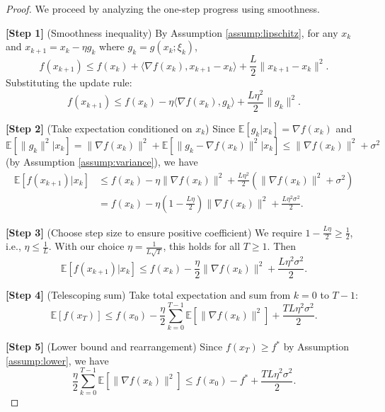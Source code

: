 \documentclass{article}
\begin{document}
\begin{proof}
    We proceed by analyzing the one-step progress using smoothness.

    \noindent \textbf{[Step 1]} (Smoothness inequality) By Assumption \ref{assump:lipschitz}, for any $x_k$ and $x_{k+1} = x_k - \eta g_k$ where $g_k = g(x_k; \xi_k)$,
    \begin{equation}
        f(x_{k+1}) \le f(x_k) + \langle \nabla f(x_k), x_{k+1}-x_k \rangle + \frac{L}{2}\|x_{k+1}-x_k\|^2.
    \end{equation}
    Substituting the update rule:
    \begin{equation}
        f(x_{k+1}) \le f(x_k) - \eta \langle \nabla f(x_k), g_k \rangle + \frac{L\eta^2}{2}\|g_k\|^2. \tag{1}
    \end{equation}

    \noindent \textbf{[Step 2]} (Take expectation conditioned on $x_k$) Since $\mathbb{E}[g_k | x_k] = \nabla f(x_k)$ and $\mathbb{E}[\|g_k\|^2 | x_k] = \|\nabla f(x_k)\|^2 + \mathbb{E}[\|g_k - \nabla f(x_k)\|^2 | x_k] \le \|\nabla f(x_k)\|^2 + \sigma^2$ (by Assumption \ref{assump:variance}), we have
    \begin{align}
        \mathbb{E}[f(x_{k+1}) | x_k] &\le f(x_k) - \eta \|\nabla f(x_k)\|^2 + \frac{L\eta^2}{2}\left(\|\nabla f(x_k)\|^2 + \sigma^2\right) \\
        &= f(x_k) - \eta\left(1 - \frac{L\eta}{2}\right)\|\nabla f(x_k)\|^2 + \frac{L\eta^2\sigma^2}{2}. \tag{2}
    \end{align}

    \noindent \textbf{[Step 3]} (Choose step size to ensure positive coefficient) We require $1 - \frac{L\eta}{2} \ge \frac{1}{2}$, i.e., $\eta \le \frac{1}{L}$. With our choice $\eta = \frac{1}{L\sqrt{T}}$, this holds for all $T \ge 1$. Then
    \begin{equation}
        \mathbb{E}[f(x_{k+1}) | x_k] \le f(x_k) - \frac{\eta}{2}\|\nabla f(x_k)\|^2 + \frac{L\eta^2\sigma^2}{2}. \tag{3}
    \end{equation}

    \noindent \textbf{[Step 4]} (Telescoping sum) Take total expectation and sum from $k=0$ to $T-1$:
    \begin{equation}
        \mathbb{E}[f(x_T)] \le f(x_0) - \frac{\eta}{2}\sum_{k=0}^{T-1} \mathbb{E}[\|\nabla f(x_k)\|^2] + \frac{T L\eta^2\sigma^2}{2}. \tag{4}
    \end{equation}

    \noindent \textbf{[Step 5]} (Lower bound and rearrangement) Since $f(x_T) \ge f^*$ by Assumption \ref{assump:lower}, we have
    \begin{equation}
        \frac{\eta}{2}\sum_{k=0}^{T-1} \mathbb{E}[\|\nabla f(x_k)\|^2] \le f(x_0) - f^* + \frac{T L\eta^2\sigma^2}{2}. \tag{5}
    \end{equation}


\end{proof}
\end{document}
